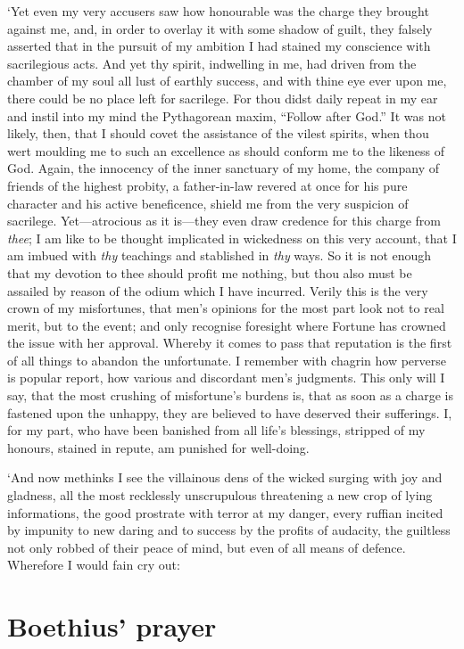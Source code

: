 \documentclass[12pt]{book}
\begin{document}
`Yet even my very accusers saw how honourable was the charge they
brought against me, and, in order to overlay it with some shadow of
guilt, they falsely asserted that in the pursuit of my ambition I had
stained my conscience with sacrilegious acts. And yet thy spirit,
indwelling in me, had driven from the chamber of my soul all lust of
earthly success, and with thine eye ever upon me, there could be no
place left for sacrilege. For thou didst daily repeat in my ear and
instil into my mind the Pythagorean maxim, ``Follow after God.'' It was
not likely, then, that I should covet the assistance of the vilest
spirits, when thou wert moulding me to such an excellence as should
conform me to the likeness of God. Again, the innocency of the inner
sanctuary of my home, the company of friends of the highest probity, a
father-in-law revered at once for his pure character and his active
beneficence, shield me from the very suspicion of sacrilege.
Yet---atrocious as it is---they even draw credence for this charge from
\emph{thee}; I am like to be thought implicated in wickedness on this very
account, that I am imbued with \emph{thy} teachings and stablished in \emph{thy}
ways. So it is not enough that my devotion to thee should profit me
nothing, but thou also must be assailed by reason of the odium which I
have incurred. Verily this is the very crown of my misfortunes, that
men's opinions for the most part look not to real merit, but to the
event; and only recognise foresight where Fortune has crowned the issue
with her approval. Whereby it comes to pass that reputation is the first
of all things to abandon the unfortunate. I remember with chagrin how
perverse is popular report, how various and discordant men's judgments.
This only will I say, that the most crushing of misfortune's burdens is,
that as soon as a charge is fastened upon the unhappy, they are believed
to have deserved their sufferings. I, for my part, who have been
banished from all life's blessings, stripped of my honours, stained in
repute, am punished for well-doing.

`And now methinks I see the villainous dens of the wicked surging with
joy and gladness, all the most recklessly unscrupulous threatening a new
crop of lying informations, the good prostrate with terror at my danger,
every ruffian incited by impunity to new daring and to success by the
profits of audacity, the guiltless not only robbed of their peace of
mind, but even of all means of defence. Wherefore I would fain cry out:


\section{Boethius' prayer}
\end{document}
